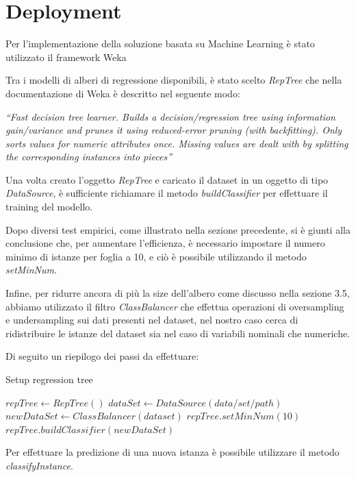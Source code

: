 \documentclass[a4paper, 11pt, oneside]{report}
\begin{document}
            \section{Deployment}
            Per l'implementazione della soluzione basata su Machine Learning è stato utilizzato il framework Weka\cite{2}\\
            \par \noindent Tra i modelli di alberi di regressione disponibili, è stato scelto \emph{RepTree} che nella documentazione di Weka è descritto nel seguente modo:
            \begin{center}
                \emph{``Fast decision tree learner. Builds a decision/regression tree using information gain/variance and prunes it using reduced-error pruning (with backfitting).
                Only sorts values for numeric attributes once. Missing values are dealt with by splitting the corresponding instances into pieces''}
            \end{center}
            Una volta creato l'oggetto \emph{RepTree} e caricato il dataset in un oggetto di tipo \emph{DataSource}, è sufficiente richiamare il metodo
            \emph{buildClassifier} per effettuare il training del modello.
            \par \noindent Dopo diversi test empirici, come illustrato nella sezione precedente, si è giunti alla conclusione che, per aumentare l'efficienza, è necessario
            impostare il numero minimo di istanze per foglia a 10, e ciò è possibile utilizzando il metodo \emph{setMinNum}.
            \par \noindent Infine, per ridurre ancora di più la size dell'albero come discusso nella sezione 3.5, abbiamo utilizzato il
            filtro \emph{ClassBalancer} che effettua operazioni di oversampling e undersampling sui dati presenti nel
            dataset, nel nostro caso cerca di ridistribuire le istanze del dataset sia nel caso di variabili nominali che
            numeriche.\\
            \par \noindent Di seguito un riepilogo dei passi da effettuare:
            \medskip
            \begin{algorithm}
                \caption{Setup regression tree}
                \label{alg:ml}
                \begin{algorithmic}[1]
                    \State $repTree \gets RepTree()$
                    \State $dataSet \gets DataSource(data/set/path)$
                    \State $newDataSet \gets ClassBalancer(dataset)$
                    \State
                    \State $repTree.setMinNum(10)$
                    \State $repTree.buildClassifier(newDataSet)$
                \end{algorithmic}
            \end{algorithm}
            \par \noindent Per effettuare la predizione di una nuova istanza è possibile utilizzare il metodo \emph{classifyInstance}.
\end{document}
